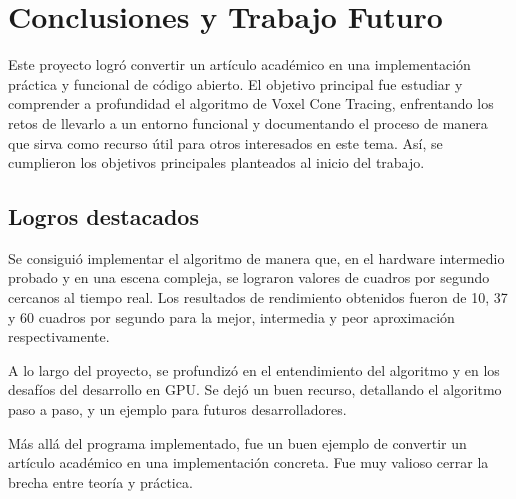 \graphicspath{{chapters/6_conclusión/figures/}}



\chapter{Conclusiones y Trabajo Futuro}\label{chap:conclusions}

Este proyecto logró convertir un artículo académico en una implementación práctica y funcional de código abierto.
El objetivo principal fue estudiar y comprender a profundidad el algoritmo de Voxel Cone Tracing, enfrentando los retos de llevarlo a un entorno funcional y documentando el proceso de manera que sirva como recurso útil para otros interesados en este tema.
Así, se cumplieron los objetivos principales planteados al inicio del trabajo.

\section{Logros destacados}

Se consiguió implementar el algoritmo de manera que, en el hardware intermedio probado y en una escena compleja, se lograron valores de cuadros por segundo cercanos al tiempo real.
Los resultados de rendimiento obtenidos fueron de 10, 37 y 60 cuadros por segundo para la mejor, intermedia y peor aproximación respectivamente.

A lo largo del proyecto, se profundizó en el entendimiento del algoritmo y en los desafíos del desarrollo en GPU.
Se dejó un buen recurso, detallando el algoritmo paso a paso, y un ejemplo para futuros desarrolladores.

Más allá del programa implementado, fue un buen ejemplo de convertir un artículo académico en una implementación concreta.
Fue muy valioso cerrar la brecha entre teoría y práctica.

